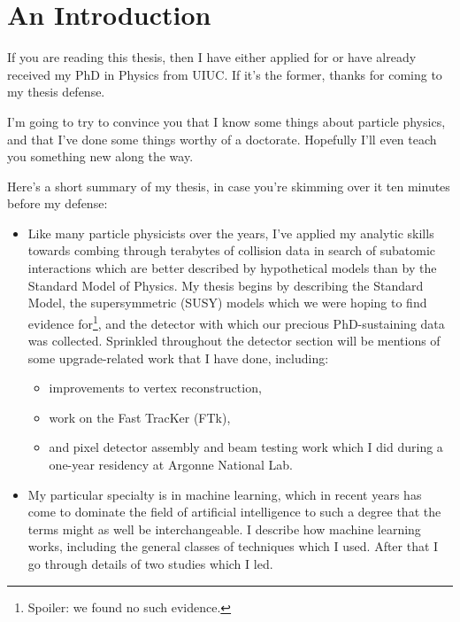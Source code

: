 \chapter{An Introduction}

If you are reading this thesis, then I have either applied for or have  already received my PhD in Physics from UIUC. If it's the former, thanks for coming to my thesis defense.

I'm going to try to convince you that I know some things about particle physics, and that I've done some things worthy of a doctorate. Hopefully I'll even teach you something new along the way.

Here's a short summary of my thesis, in case you're skimming over it ten minutes before my defense:

\begin{itemize}

    \item Like many particle physicists over the years, I've applied my analytic skills towards combing through terabytes of collision data in search of subatomic interactions which are better described by hypothetical models than by the Standard Model of Physics. My thesis begins by describing the Standard Model, the supersymmetric (SUSY) models which we were hoping to find evidence for\footnote{Spoiler: we found no such evidence.}, and the detector with which our precious PhD-sustaining data was collected. Sprinkled throughout the detector section will be mentions of some upgrade-related work that I have done, including:
    
    \begin{itemize}
        \item improvements to vertex reconstruction,
        \item work on the Fast TracKer (FTk),
        \item and pixel detector assembly and beam testing work which I did during a one-year residency at Argonne National Lab.
    \end{itemize}

    \item My particular specialty is in machine learning, which in recent years has come to dominate the field of artificial intelligence to such a degree that the terms might as well be interchangeable. I describe how machine learning works, including the general classes of techniques which I used. After that I go through details of two studies which I led.
    
    \begin{itemize}
    

\end{itemize}
\end{itemize}
